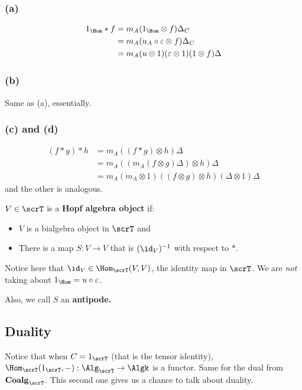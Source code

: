 \documentclass[12pt]{article}
\newcommand*{\Coalg}{\mathbf{Coalg}}
\begin{document}
 \begin{prf}
	\subsubsection*{(a)}
	\begin{align*}
		1_{\Hom}\ast f&= m_A(1_{\Hom}\otimes f)\Delta_C\\
		&=m_A(u_A\circ\varepsilon\otimes f)\Delta_C\\
		&=m_A(u\otimes 1)(\varepsilon\otimes 1)(1\otimes f)\Delta
	\end{align*}
	\subsubsection*{(b)}
	Same as (a), essentially.
	\subsubsection*{(c) and (d)}
	\begin{align*}
		(f\ast g)\ast h&= m_A((f\ast g)\otimes h)\Delta\\
		&=m_A((m_A(f\otimes g)\Delta)\otimes h)\Delta\\
		&=m_A(m_A\otimes 1)((f\otimes g)\otimes h)(\Delta\otimes 1)\Delta
	\end{align*}
	and the other is analogous.
 \end{prf}

 \begin{defn}
	$V\in\scrT$ is a \textbf{Hopf algebra object} if:
	\begin{itemize}
		\item $V$ is a bialgebra object in $\scrT$ and
		\item There is a map $S:V\to V$ that is $(\id_V)^{-1}$ with respect to $\ast$.
	\end{itemize}
 \end{defn}
 \begin{rmk}
	Notice here that $\id_V\in\Hom_\scrT(V,V)$, the identity map in $\scrT$. We are \textit{not}
	taking about $1_{\Hom}=u\circ\varepsilon$.

	Also, we call $S$ an \textbf{antipode.}
 \end{rmk}

 \subsection{Duality}
 Notice that when $C=1_\scrT$ (that is the tensor identity), $\Hom_\scrT(1_\scrT,-):\Alg_\scrT\to\Algk$
 is a functor. Same for the dual from $\Coalg_\scrT$. This second one gives us a chance to talk about duality.
\end{document}
